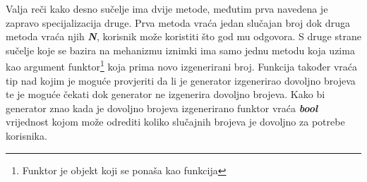 Valja reči kako desno sučelje ima dvije metode, međutim prva navedena je zapravo specijalizacija druge. Prva metoda vraća jedan slučajan broj dok druga metoda vraća njih \textbf{\textit{N}}, korisnik može koristiti što god mu odgovora. S druge strane sučelje koje se bazira na mehanizmu iznimki ima samo jednu metodu koja uzima kao argument funktor\footnote{Funktor je objekt koji se ponaša kao funkcija} koja prima novo izgenerirani broj. Funkcija također vraća tip nad kojim je moguće provjeriti da li je generator izgenerirao dovoljno brojeva te je moguće čekati dok generator ne izgenerira dovoljno brojeva. Kako bi generator znao kada je dovoljno brojeva izgenerirano funktor vraća \textbf{\textit{bool}} vrijednost kojom može odrediti koliko slučajnih brojeva je dovoljno za potrebe korisnika.